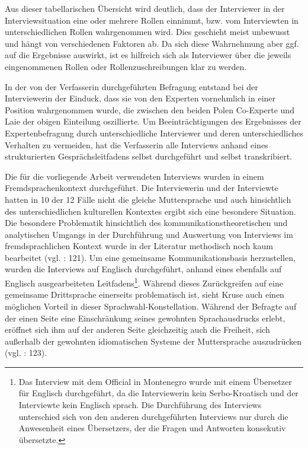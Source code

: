 Aus dieser tabellarischen Übersicht wird deutlich, dass der Interviewer in der Interviewsituation eine oder mehrere Rollen einnimmt, bzw. vom Interviewten in unterschiedlichen Rollen wahrgenommen wird. Dies geschieht meist unbewusst und hängt von verschiedenen Faktoren ab. Da sich diese Wahrnehmung aber ggf. auf die Ergebnisse auswirkt, ist es hilfreich sich als Interviewer über die jeweils eingenommenen Rollen oder Rollenzuschreibungen klar zu werden. \par
In der von der Verfasserin durchgeführten Befragung entstand bei der Interviewerin der Einduck, dass sie von den Experten vornehmlich in einer Position wahrgenommen wurde, die zwischen den beiden Polen Co-Experte und Laie der obigen Einteilung oszillierte. Um Beeinträchtigungen des Ergebnisses der Expertenbefragung durch unterschiedliche Interviewer und deren unterschiedliches Verhalten zu vermeiden, hat die Verfasserin alle Interviews anhand eines strukturierten Gesprächsleitfadens selbst durchgeführt und selbst transkribiert.\par
Die für die vorliegende Arbeit verwendeten Interviews wurden in einem Fremdsprachenkontext durchgeführt. Die Interviewerin und der Interviewte hatten in 10 der 12 Fälle nicht die gleiche Muttersprache und auch hinsichtlich des unterschiedlichen kulturellen Kontextes ergibt sich eine besondere Situation. Die besondere Problematik hinsichtlich des kommunikationstheoretischen und analytischen Umgangs in der Durchführung und Auswertung von Interviews im fremdsprachlichen Kontext wurde in der Literatur methodisch noch kaum bearbeitet (vgl. \cite{kruse}: 121). Um eine gemeinsame Kommunikationsbasis herzustellen, wurden die Interviews auf Englisch durchgeführt, anhand eines ebenfalls auf Englisch ausgearbeiteten Leitfadens\footnote{Das Interview mit dem Official in Montenegro wurde mit einem Übersetzer für Englisch durchgeführt, da die Interviewerin kein Serbo-Kroatisch und der Interviewte kein Englisch sprach. Die Durchführung des Interviews unterschied sich von den anderen durchgeführten Interviews nur durch die Anwesenheit eines Übersetzers, der die Fragen und Antworten konsekutiv übersetzte.}. Während dieses Zurückgreifen auf eine gemeinsame Drittsprache einerseits problematisch ist, sieht Kruse auch einen möglichen Vorteil in dieser Sprachwahl-Konstellation. Während der Befragte auf der einen Seite eine Einschränkung seines gewohnten Sprachausdrucks erlebt, eröffnet sich ihm auf der anderen Seite gleichzeitig auch die Freiheit, sich außerhalb der gewohnten idiomatischen Systeme der Muttersprache auszudrücken (vgl. \cite{kruse}: 123). \par
